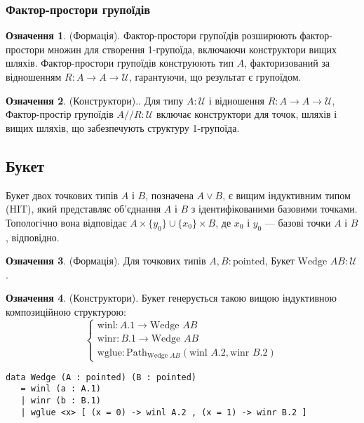 \documentclass{article}
\theoremstyle{definition}
\newtheorem{definition}{Означення}
\begin{document}
\subsubsection*{Фактор-простори групоїдів}
\begin{definition} (Формація).
Фактор-простори групоїдів розширюють фактор-простори множин для створення 1-групоїда,
включаючи конструктори вищих шляхів. Фактор-простори групоїдів
конструюють тип \( A \), факторизований за відношенням \( R : A \to A \to \mathcal{U} \),
гарантуючи, що результат є групоїдом.
\end{definition}

\begin{definition} (Конструктори)..
Для типу \( A : \mathcal{U} \) і відношення \( R : A \to A \to \mathcal{U} \),
Фактор-простір групоїдів \(  A // R : \mathcal{U} \) включає
конструктори для точок, шляхів і вищих шляхів, що забезпечують структуру 1-групоїда.
\end{definition}

\newpage
\subsection{Букет}
Букет двох точкових типів \( A \) і \( B \), позначена \( A \vee B \),
є вищим індуктивним типом (HIT), який представляє об’єднання \( A \)
і \( B \) з ідентифікованими базовими точками. Топологічно
вона відповідає \( A \times \{ y_0 \} \cup \{ x_0 \} \times B \),
де \( x_0 \) і \( y_0 \) — базові точки \( A \) і \( B \), відповідно.

\begin{definition} (Формація).
Для точкових типів \( A, B : \text{pointed} \), Букет \( \text{Wedge } A B : \mathcal{U} \).
\end{definition}

\begin{definition} (Конструктори).
Букет генерується такою вищою індуктивною композиційною структурою:
\[
\begin{cases}
\text{winl} : A.1 \to \text{Wedge } A B \\
\text{winr} : B.1 \to \text{Wedge } A B \\
\text{wglue} : \text{Path}_{\text{Wedge } A B} (\text{winl } A.2, \text{winr } B.2)
\end{cases}
\]
\begin{lstlisting}
data Wedge (A : pointed) (B : pointed)
   = winl (a : A.1)
   | winr (b : B.1)
   | wglue <x> [ (x = 0) -> winl A.2 , (x = 1) -> winr B.2 ]
\end{lstlisting}
\end{definition}
\end{document}

